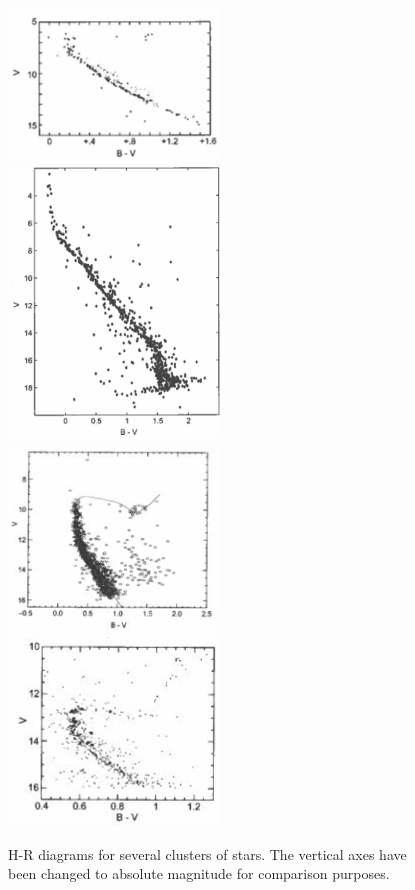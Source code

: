 \begin{figure}
	\includegraphics[width=0.5\textwidth]{hr-diagram-pos/mystery-hr-1}
	\includegraphics[width=0.5\textwidth]{hr-diagram-pos/mystery-hr-2}
		\includegraphics[width=0.5\textwidth]{hr-diagram-pos/mystery-hr-3}
			\includegraphics[width=0.5\textwidth]{hr-diagram-pos/mystery-hr-4}
	\caption{H-R diagrams for several clusters of stars. The vertical axes have been changed to absolute magnitude for comparison purposes.}\label{hr:fig:hrs}
\end{figure}


